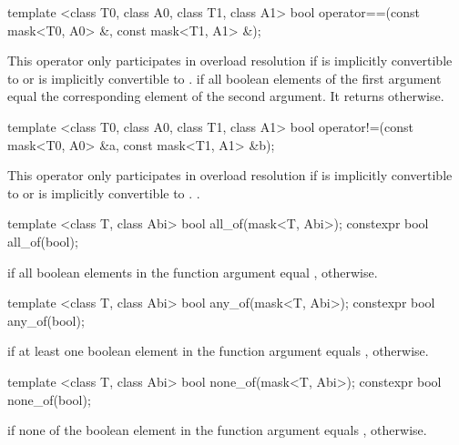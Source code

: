 \begin{itemdecl}
template <class T0, class A0, class T1, class A1>
bool operator==(const mask<T0, A0> &, const mask<T1, A1> &);
\end{itemdecl}
\newcommand\maskCompareRemark{\pnum\remarks This operator only participates in overload resolution if \mask[<T0, A0>] is implicitly convertible to \mask[<T1, A1>] or \mask[<T1, A1>] is implicitly convertible to \mask[<T0, A0>].}
\begin{itemdescr}
  \maskCompareRemark
  \pnum\returns \true if all boolean elements of the first argument equal the corresponding element of the second argument.
  It returns \false otherwise.
\end{itemdescr}

\begin{itemdecl}
template <class T0, class A0, class T1, class A1>
bool operator!=(const mask<T0, A0> &a, const mask<T1, A1> &b);
\end{itemdecl}
\begin{itemdescr}
  \maskCompareRemark
  \pnum\returns {}.
\end{itemdescr}

\begin{itemdecl}
template <class T, class Abi> bool  all_of(mask<T, Abi>);
constexpr bool  all_of(bool);
\end{itemdecl}
\begin{itemdescr}
  \pnum\returns \true if all boolean elements in the function argument equal \true, \false otherwise.
\end{itemdescr}

\begin{itemdecl}
template <class T, class Abi> bool  any_of(mask<T, Abi>);
constexpr bool  any_of(bool);
\end{itemdecl}
\begin{itemdescr}
  \pnum\returns \true if at least one boolean element in the function argument equals \true, \false otherwise.
\end{itemdescr}

\begin{itemdecl}
template <class T, class Abi> bool none_of(mask<T, Abi>);
constexpr bool none_of(bool);
\end{itemdecl}
\begin{itemdescr}
  \pnum\returns \true if none of the boolean element in the function argument equals \true, \false otherwise.
\end{itemdescr}


